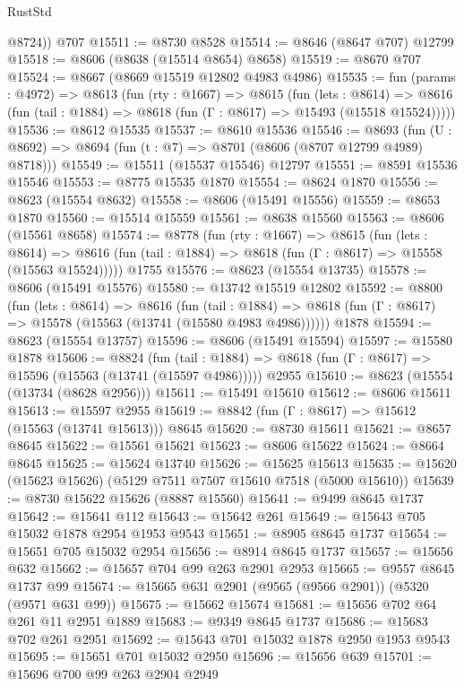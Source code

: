 \begin{lexlean}{RustStd}
\begin{coremodule}
        @8724))
    @707
@15511 := @8730 @8528
@15514 := @8646 (@8647 @707) @12799
@15518 := @8606 (@8638 (@15514 @8654) @8658)
@15519 := @8670 @707
@15524 := @8667 (@8669 @15519 @12802 @4983 @4986)
@15535 := fun (params : @4972) =>
  @8613
    (fun (rty : @1667) =>
    @8615
      (fun (lets : @8614) =>
      @8616 (fun (tail : @1884) => @8618 (fun (Γ : @8617) => @15493 (@15518 @15524)))))
@15536 := @8612 @15535
@15537 := @8610 @15536
@15546 := @8693
    (fun (U : @8692) => @8694 (fun (t : @7) => @8701 (@8606 (@8707 @12799 @4989) @8718)))
@15549 := @15511 (@15537 @15546) @12797
@15551 := @8591 @15536 @15546
@15553 := @8775 @15535 @1870
@15554 := @8624 @1870
@15556 := @8623 (@15554 @8632)
@15558 := @8606 (@15491 @15556)
@15559 := @8653 @1870
@15560 := @15514 @15559
@15561 := @8638 @15560
@15563 := @8606 (@15561 @8658)
@15574 := @8778
    (fun (rty : @1667) =>
    @8615
      (fun (lets : @8614) =>
      @8616 (fun (tail : @1884) => @8618 (fun (Γ : @8617) => @15558 (@15563 @15524)))))
    @1755
@15576 := @8623 (@15554 @13735)
@15578 := @8606 (@15491 @15576)
@15580 := @13742 @15519 @12802
@15592 := @8800
    (fun (lets : @8614) =>
    @8616
      (fun (tail : @1884) =>
      @8618 (fun (Γ : @8617) => @15578 (@15563 (@13741 (@15580 @4983 @4986))))))
    @1878
@15594 := @8623 (@15554 @13757)
@15596 := @8606 (@15491 @15594)
@15597 := @15580 @1878
@15606 := @8824
    (fun (tail : @1884) => @8618 (fun (Γ : @8617) => @15596 (@15563 (@13741 (@15597 @4986)))))
    @2955
@15610 := @8623 (@15554 (@13734 (@8628 @2956)))
@15611 := @15491 @15610
@15612 := @8606 @15611
@15613 := @15597 @2955
@15619 := @8842 (fun (Γ : @8617) => @15612 (@15563 (@13741 @15613))) @8645
@15620 := @8730 @15611
@15621 := @8657 @8645
@15622 := @15561 @15621
@15623 := @8606 @15622
@15624 := @8664 @8645
@15625 := @15624 @13740
@15626 := @15625 @15613
@15635 := @15620 (@15623 @15626) (@5129 @7511 @7507 @15610 @7518 (@5000 @15610))
@15639 := @8730 @15622 @15626 (@8887 @15560)
@15641 := @9499 @8645 @1737
@15642 := @15641 @112
@15643 := @15642 @261
@15649 := @15643 @705 @15032 @1878 @2954 @1953 @9543
@15651 := @8905 @8645 @1737
@15654 := @15651 @705 @15032 @2954
@15656 := @8914 @8645 @1737
@15657 := @15656 @632
@15662 := @15657 @704 @99 @263 @2901 @2953
@15665 := @9557 @8645 @1737 @99
@15674 := @15665 @631 @2901 (@9565 (@9566 @2901)) (@5320 (@9571 @631 @99))
@15675 := @15662 @15674
@15681 := @15656 @702 @64 @261 @11 @2951 @1889
@15683 := @9349 @8645 @1737
@15686 := @15683 @702 @261 @2951
@15692 := @15643 @701 @15032 @1878 @2950 @1953 @9543
@15695 := @15651 @701 @15032 @2950
@15696 := @15656 @639
@15701 := @15696 @700 @99 @263 @2904 @2949

\end{coremodule}
\end{lexlean}
